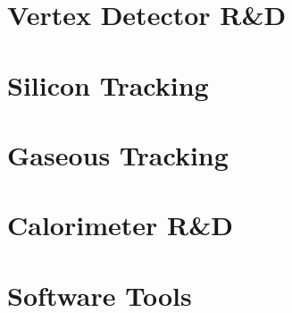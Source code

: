 \documentclass[10pt,final]{report}
\begin{document}
\tableofcontents
\listoftodos
\chapter{Vertex Detector R\&D}








\newpage



\newpage
\chapter{Silicon Tracking}


\chapter{Gaseous Tracking}

\chapter{Calorimeter R\&D}












\chapter{Software Tools}



\printbibliography
\end{document}
